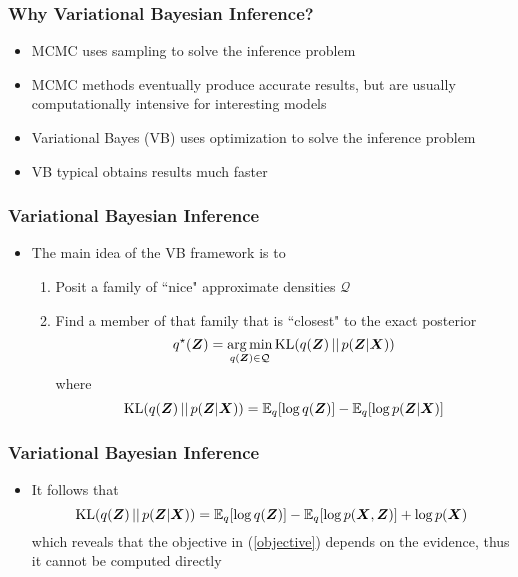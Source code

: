 \documentclass[10pt, compress, notheorems, aspectratio=169]{beamer}
\let\originalleft\left
\let\originalright\right
\renewcommand{\left}{\mathopen{}\mathclose \bgroup \originalleft}
\renewcommand{\right}{\aftergroup \egroup \originalright}
\newcommand{\E}{\mathbb{E}}
\DeclareMathOperator*{\argmin}{arg\,min}
\begin{document}
\begin{frame}
	\frametitle{Why Variational Bayesian Inference?}
	\begin{itemize}
		\item MCMC uses sampling to solve the inference problem
		\item MCMC methods eventually produce accurate results, but are usually computationally intensive for interesting models
		\item Variational Bayes (VB) uses optimization to solve the inference problem
		\item VB typical obtains results much faster
	\end{itemize}
\end{frame}

\begin{frame}
	\frametitle{Variational Bayesian Inference}
	\begin{itemize}
		\item The main idea of the VB framework is to
			\begin{enumerate}
				\item Posit a family of ``nice" approximate densities $\mathcal Q$
				\item Find a member of that family that is ``closest" to the exact posterior
					\begin{equation}
						q^{\star} \left( {\bm Z} \right) = \argmin_{q \left( {\bm Z} \right) \in \mathcal Q} \text{KL} \left( q \left( {\bm Z} \right) \, || \, p \left( {\bm Z} | {\bm X} \right) \right) \label{objective}
					\end{equation}
					where 
					\begin{equation}
						\text{KL} \left( q \left( {\bm Z} \right) \, || \, p \left( {\bm Z} | {\bm X} \right) \right) = \E_q \left[ \log q \left( {\bm Z} \right)\right] - \E_q \left[ \log p \left( {\bm Z} | {\bm X} \right) \right]
					\end{equation}
			\end{enumerate}	
	\end{itemize}
\end{frame}

\begin{frame}
	\frametitle{Variational Bayesian Inference}
	\begin{itemize}
		\item It follows that 
			\begin{equation*}
				\text{KL} \left( q \left( {\bm Z} \right) \, || \, p \left( {\bm Z} | {\bm X} \right) \right) = \E_q \left[ \log q \left( {\bm Z} \right)\right] - \E_q \left[ \log p \left( {\bm X}, {\bm Z} \right) \right] + \log p \left( {\bm X} \right)
			\end{equation*}
			which reveals that the objective in (\ref{objective}) depends on the evidence, thus it cannot be computed directly
	\end{itemize}
\end{frame}
\end{document}
